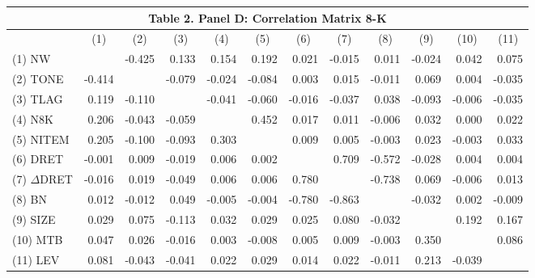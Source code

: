 \begin{table}[H] \label{T2PD}
  \centering
    \begin{tabular}{lrrrrrrrrrrr}
    \multicolumn{12}{c}{\textbf{Table 2. Panel D: Correlation Matrix 8-K}} \\
    \midrule
      & \multicolumn{1}{c}{(1)} & \multicolumn{1}{c}{(2)} & \multicolumn{1}{c}{(3)} & \multicolumn{1}{c}{(4)} & \multicolumn{1}{c}{(5)} & \multicolumn{1}{c}{(6)} & \multicolumn{1}{c}{(7)} & \multicolumn{1}{c}{(8)} & \multicolumn{1}{c}{(9)} & \multicolumn{1}{c}{(10)} & \multicolumn{1}{c}{(11)} \\
    \midrule
    (1) NW & & -0.425 & 0.133 & 0.154 & 0.192 & 0.021 & -0.015 & 0.011 & -0.024 & 0.042 & 0.075 \\
    (2) TONE & -0.414 & & -0.079 & -0.024 & -0.084 & 0.003 & 0.015 & -0.011 & 0.069 & 0.004 & -0.035 \\
    (3) TLAG & 0.119 & -0.110 & & -0.041 & -0.060 & -0.016 & -0.037 & 0.038 & -0.093 & -0.006 & -0.035 \\
    (4) N8K & 0.206 & -0.043 & -0.059 & & 0.452 & 0.017 & 0.011 & -0.006 & 0.032 & 0.000 & 0.022 \\
    (5) NITEM & 0.205 & -0.100 & -0.093 & 0.303 & & 0.009 & 0.005 & -0.003 & 0.023 & -0.003 & 0.033 \\
    (6) DRET & -0.001 & 0.009 & -0.019 & 0.006 & 0.002 & & 0.709 & -0.572 & -0.028 & 0.004 & 0.004 \\
    (7) $\Delta$DRET & -0.016 & 0.019 & -0.049 & 0.006 & 0.006 & 0.780 & & -0.738 & 0.069 & -0.006 & 0.013 \\
    (8) BN & 0.012 & -0.012 & 0.049 & -0.005 & -0.004 & -0.780 & -0.863 & & -0.032 & 0.002 & -0.009 \\
    (9) SIZE & 0.029 & 0.075 & -0.113 & 0.032 & 0.029 & 0.025 & 0.080 & -0.032 & & 0.192 & 0.167 \\
    (10) MTB & 0.047 & 0.026 & -0.016 & 0.003 & -0.008 & 0.005 & 0.009 & -0.003 & 0.350 & & 0.086 \\
    (11) LEV & 0.081 & -0.043 & -0.041 & 0.022 & 0.029 & 0.014 & 0.022 & -0.011 & 0.213 & -0.039 & \\
    \bottomrule
    \end{tabular}%
  \label{tab:addlabel}%
\end{table}%
